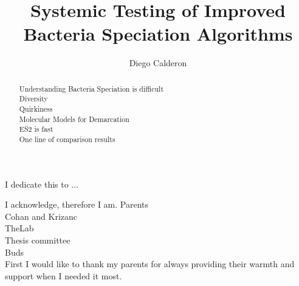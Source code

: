 \documentclass[11pt, draft]{westhesis}
\title{Systemic Testing of Improved Bacteria Speciation Algorithms}
\author{Diego Calderon}
\begin{document}

\begin{dedication}
I dedicate this to ...
\end{dedication}

\begin{acknowledgements}
I acknowledge, therefore I am.
Parents \\
Cohan and Krizanc \\
TheLab \\
Thesis committee \\
Buds \\

First I would like to thank my parents for always providing their warmth and support %
when I needed it most. 
\end{acknowledgements}

\begin{abstract}
Understanding Bacteria Speciation is difficult \\
Diversity \\
Quirkiness \\
Molecular Models for Demarcation \\
ES2 is fast \\
One line of comparison results \\
\end{abstract}

\frontmatter
\maketitle
\makededication
\makeack
\makeabstract
\tableofcontents

\mainmatter







\appendix




\printindex

\backmatter
\end{document}
